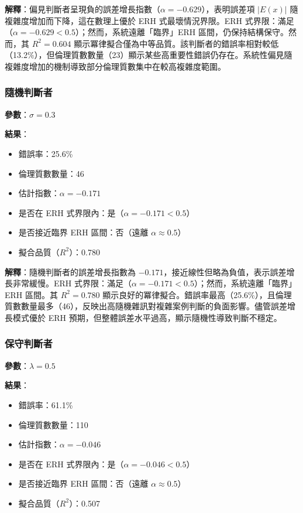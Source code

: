 \documentclass[12pt,a4paper]{article}
\theoremstyle{definition}
\theoremstyle{remark}
\begin{document}
\textbf{解釋}：偏見判斷者呈現負的誤差增長指數（$\alpha = -0.629$），表明誤差項 $|E(x)|$ 隨複雜度增加而下降，這在數理上優於 ERH 式最壞情況界限。ERH 式界限：滿足（$\alpha = -0.629 < 0.5$）；然而，系統遠離「臨界」ERH 區間，仍保持結構保守。然而，其 $R^2 = 0.604$ 顯示冪律擬合僅為中等品質。該判斷者的錯誤率相對較低（13.2\%），但倫理質數數量（23）顯示某些高重要性錯誤仍存在。系統性偏見隨複雜度增加的機制導致部分倫理質數集中在較高複雜度範圍。

\subsubsection{隨機判斷者}

\textbf{參數}：$\sigma = 0.3$

\textbf{結果}：
\begin{itemize}
    \item 錯誤率：25.6\%
    \item 倫理質數數量：46
    \item 估計指數：$\alpha = -0.171$
    \item 是否在 ERH 式界限內：是（$\alpha = -0.171 < 0.5$）
    \item 是否接近臨界 ERH 區間：否（遠離 $\alpha \approx 0.5$）
    \item 擬合品質（$R^2$）：0.780
\end{itemize}

\textbf{解釋}：隨機判斷者的誤差增長指數為 $-0.171$，接近線性但略為負值，表示誤差增長非常緩慢。ERH 式界限：滿足（$\alpha = -0.171 < 0.5$）；然而，系統遠離「臨界」ERH 區間。其 $R^2 = 0.780$ 顯示良好的冪律擬合。錯誤率最高（25.6\%），且倫理質數數量最多（46），反映出高隨機雜訊對複雜案例判斷的負面影響。儘管誤差增長模式優於 ERH 預期，但整體誤差水平過高，顯示隨機性導致判斷不穩定。

\subsubsection{保守判斷者}

\textbf{參數}：$\lambda = 0.5$

\textbf{結果}：
\begin{itemize}
    \item 錯誤率：61.1\%
    \item 倫理質數數量：110
    \item 估計指數：$\alpha = -0.046$
    \item 是否在 ERH 式界限內：是（$\alpha = -0.046 < 0.5$）
    \item 是否接近臨界 ERH 區間：否（遠離 $\alpha \approx 0.5$）
    \item 擬合品質（$R^2$）：0.507
\end{itemize}
\end{document}
